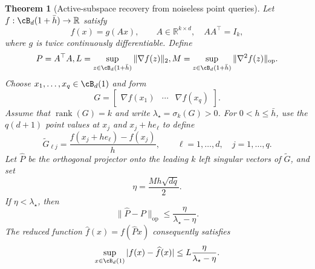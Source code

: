 \documentclass[11pt,twoside]{article}
\newcommand{\R}{\mathbb R}
\newtheorem{theorem}{Theorem}[section]
\theoremstyle{definition}
\theoremstyle{remark}
\begin{document}
\begin{theorem}[Active-subspace recovery from noiseless point queries]
\label{thm:point-query-subspace}
Let $f:\cB_d(1+\bar h)\to\R$ satisfy
\begin{equation}
 f(x)=g(Ax),
 \qquad A\in\R^{k\times d},\quad AA^\top=I_k,
 \label{eq:appendix-multi-index-model}
\end{equation}
where $g$ is twice continuously differentiable. Define
\begin{equation}
 P=A^\top A,
 \quad
 L=\sup_{z\in\cB_d(1+\bar h)}\|\nabla f(z)\|_2,
 \quad
 M=\sup_{z\in\cB_d(1+\bar h)}\|\nabla^2f(z)\|_{\mathrm{op}}.
 \label{eq:active-query-regularity}
\end{equation}
Choose $x_1,\ldots,x_q\in\cB_d(1)$ and form
\begin{equation}
 G=\begin{bmatrix}\nabla f(x_1)&\cdots&\nabla f(x_q)\end{bmatrix}.
 \label{eq:sampled-gradient-matrix}
\end{equation}
Assume that $\operatorname{rank}(G)=k$ and write
$\lambda_\star=\sigma_k(G)>0$. For $0<h\leq\bar h$, use the
$q(d+1)$ point values at $x_j$ and $x_j+he_\ell$ to define
\begin{equation}
 \widetilde G_{\ell j}
 =\frac{f(x_j+he_\ell)-f(x_j)}{h},
 \qquad \ell=1,\ldots,d,\quad j=1,\ldots,q.
 \label{eq:coordinate-finite-difference-matrix}
\end{equation}
Let $\widehat P$ be the orthogonal projector onto the leading $k$ left
singular vectors of $\widetilde G$, and set
\begin{equation}
 \eta=\frac{Mh\sqrt{dq}}2.
 \label{eq:finite-difference-perturbation}
\end{equation}
If $\eta<\lambda_\star$, then
\begin{equation}
 \|\widehat P-P\|_{\mathrm{op}}
 \leq \frac{\eta}{\lambda_\star-\eta}.
 \label{eq:projector-recovery-bound}
\end{equation}
The reduced function $\widehat f(x)=f(\widehat Px)$ consequently satisfies
\begin{equation}
 \sup_{x\in\cB_d(1)}|f(x)-\widehat f(x)|
 \leq L\frac{\eta}{\lambda_\star-\eta}.
 \label{eq:active-query-function-bound}
\end{equation}
\end{theorem}
\end{document}
